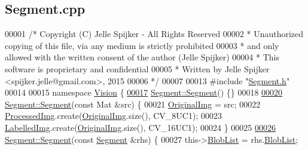 \hypertarget{_segment_8cpp_source}{}\subsection{Segment.\+cpp}
\label{_segment_8cpp_source}

\begin{DoxyCode}
00001 \textcolor{comment}{/* Copyright (C) Jelle Spijker - All Rights Reserved}
00002 \textcolor{comment}{ * Unauthorized copying of this file, via any medium is strictly prohibited}
00003 \textcolor{comment}{ * and only allowed with the written consent of the author (Jelle Spijker)}
00004 \textcolor{comment}{ * This software is proprietary and confidential}
00005 \textcolor{comment}{ * Written by Jelle Spijker <spijker.jelle@gmail.com>, 2015}
00006 \textcolor{comment}{ */}
00007 
00013 \textcolor{preprocessor}{#include "\hyperlink{_segment_8h}{Segment.h}"}
00014 
00015 \textcolor{keyword}{namespace }\hyperlink{namespace_vision}{Vision} \{
\hypertarget{_segment_8cpp_source_l00017}{}\hyperlink{class_vision_1_1_segment_adfe9fc7ffcc7269f961d4b1f6720d1e8}{00017} \hyperlink{class_vision_1_1_segment_adfe9fc7ffcc7269f961d4b1f6720d1e8}{Segment::Segment}() \{\}
00018 
\hypertarget{_segment_8cpp_source_l00020}{}\hyperlink{class_vision_1_1_segment_ad3c4765e0e519f8d5fc7ac2e567608ee}{00020} \hyperlink{class_vision_1_1_segment_adfe9fc7ffcc7269f961d4b1f6720d1e8}{Segment::Segment}(\textcolor{keyword}{const} Mat &src) \{
00021   \hyperlink{class_vision_1_1_image_processing_a77c370dab270158a4e9c634e2d3f48e7}{OriginalImg} = src;
00022   \hyperlink{class_vision_1_1_image_processing_aa7d65742882cd1b2a1e4e9cb68809211}{ProcessedImg}.create(\hyperlink{class_vision_1_1_image_processing_a77c370dab270158a4e9c634e2d3f48e7}{OriginalImg}.size(), CV\_8UC1);
00023   \hyperlink{class_vision_1_1_segment_a4daa143f6cd4a753d3bbe45c6a67d27f}{LabelledImg}.create(\hyperlink{class_vision_1_1_image_processing_a77c370dab270158a4e9c634e2d3f48e7}{OriginalImg}.size(), CV\_16UC1);
00024 \}
00025 
\hypertarget{_segment_8cpp_source_l00026}{}\hyperlink{class_vision_1_1_segment_a365b40b1f7886344c063c881c5cd27ca}{00026} \hyperlink{class_vision_1_1_segment_adfe9fc7ffcc7269f961d4b1f6720d1e8}{Segment::Segment}(\textcolor{keyword}{const} \hyperlink{class_vision_1_1_segment}{Segment} &rhs) \{
00027   this->\hyperlink{class_vision_1_1_segment_a74e0600a7dd49bd7110ee27bb4cd6e0e}{BlobList} = rhs.\hyperlink{class_vision_1_1_segment_a74e0600a7dd49bd7110ee27bb4cd6e0e}{BlobList};

\end{DoxyCode}
